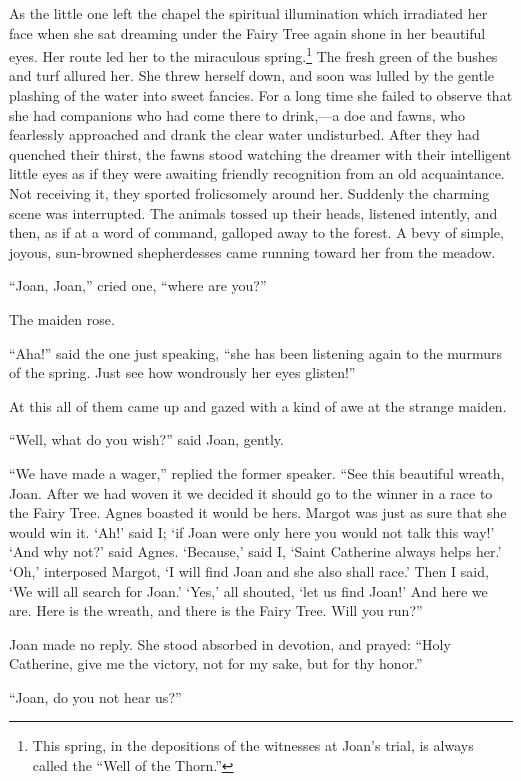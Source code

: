 As the little one left the chapel the spiritual illumination which
irradiated her face when she sat dreaming under the Fairy Tree again
shone in her beautiful eyes. Her route led her to the miraculous
spring.\footnote{This spring, in the depositions of the witnesses at
  Joan's trial, is always called the ``Well of the Thorn.''} The fresh
green of the bushes and turf allured her. She threw herself down, and
soon was lulled by the gentle plashing of the water into sweet fancies.
For a long time she failed to observe that she had companions who had
come there to drink,---a doe and fawns, who fearlessly approached and
drank the clear water undisturbed. After they had quenched their thirst,
the fawns stood watching the dreamer with their intelligent little eyes
as if they were awaiting friendly recognition from an old acquaintance.
Not receiving it, they sported frolicsomely around her. Suddenly the
charming scene was interrupted. The animals tossed up their heads,
listened intently, and then, as if at a word of command, galloped away
to the forest. A bevy of simple, joyous, sun-browned shepherdesses came
running toward her from the meadow.

``Joan, Joan,'' cried one, ``where are you?''

The maiden rose.

``Aha!'' said the one just speaking, ``she has been listening again to
the murmurs of the spring. Just see how wondrously her eyes glisten!''

At this all of them came up and gazed with a kind of awe at the strange
maiden.

``Well, what do you wish?'' said Joan, gently.

``We have made a wager,'' replied the former speaker. ``See this
beautiful wreath, Joan. After we had woven it we decided it should go to
the winner in a race to the Fairy Tree. Agnes boasted it would be hers.
Margot was just as sure that she would win it. `Ah!' said I; `if Joan
were only here you would not talk this way!' `And why not?' said Agnes.
`Because,' said I, `Saint Catherine always helps her.' `Oh,' interposed
Margot, `I will find Joan and she also shall race.' Then I said, `We
will all search for Joan.' `Yes,' all shouted, `let us find Joan!' And
here we are. Here is the wreath, and there is the Fairy Tree. Will you
run?''

Joan made no reply. She stood absorbed in devotion, and prayed: ``Holy
Catherine, give me the victory, not for my sake, but for thy honor.''

``Joan, do you not hear us?''

